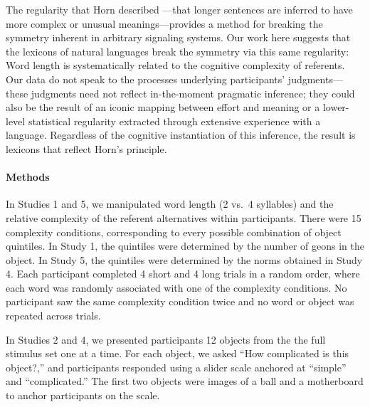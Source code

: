 \documentclass[12pt]{article}
\begin{document}
The regularity that Horn described \cite{horn1984}---that longer sentences are inferred to have more complex or unusual meanings---provides a method for breaking the symmetry inherent in arbitrary signaling systems. Our work here suggests that the lexicons of natural languages break the symmetry via this same regularity: Word length is systematically related to the cognitive complexity of referents. Our data do not speak to the processes underlying participants' judgments---these judgments need not reflect in-the-moment pragmatic inference; they could also be the result of an iconic mapping between effort and meaning or a lower-level statistical regularity extracted through extensive experience with a language. Regardless of the cognitive instantiation of this inference, the result is lexicons that reflect Horn's principle. 
%
%
%
%
%

\paragraph*{Methods}
In Studies 1 and 5, we manipulated word length (2 vs.\ 4 syllables) and the relative complexity of the referent alternatives within participants. There were 15 complexity conditions, corresponding to every possible combination of object quintiles. In Study 1, the quintiles were determined by the number of geons in the object. In Study 5, the quintiles were determined by the norms obtained in Study 4. Each participant completed 4 short and 4 long trials in a random order, where each word was randomly associated with one of the complexity conditions. No participant saw the same complexity condition twice and no word or object was repeated across trials. 

In Studies 2 and 4, we presented participants 12 objects from the the full stimulus set one at a time. For each object, we asked ``How complicated is this object?,'' and participants responded using a slider scale anchored at ``simple'' and ``complicated.'' The first two objects were images of a ball and a motherboard to anchor participants on the scale.
\end{document}
